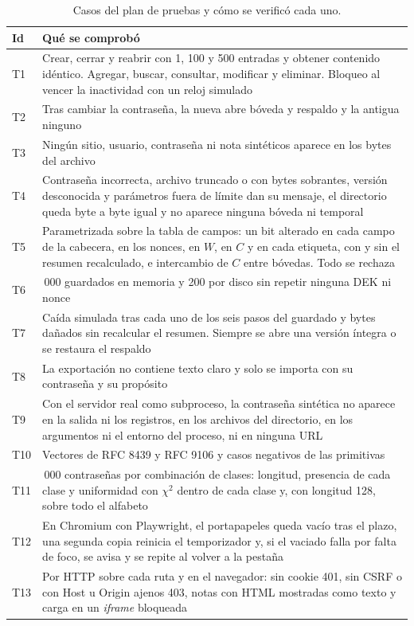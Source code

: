 \documentclass[11pt,letterpaper]{article}
\begin{document}
\begin{table}[h]
\centering\small
\caption{Casos del plan de pruebas y cómo se verificó cada uno.}
\label{tab:pruebas}
\begin{tabularx}{\linewidth}{@{}l>{\raggedright\arraybackslash}X@{}}
\toprule
Id & Qué se comprobó \\
\midrule
T1 & Crear, cerrar y reabrir con 1, 100 y 500 entradas y obtener contenido idéntico. Agregar, buscar, consultar, modificar y eliminar. Bloqueo al vencer la inactividad con un reloj simulado \\
T2 & Tras cambiar la contraseña, la nueva abre bóveda y respaldo y la antigua ninguno \\
T3 & Ningún sitio, usuario, contraseña ni nota sintéticos aparece en los bytes del archivo \\
T4 & Contraseña incorrecta, archivo truncado o con bytes sobrantes, versión desconocida y parámetros fuera de límite dan su mensaje, el directorio queda byte a byte igual y no aparece ninguna bóveda ni temporal \\
T5 & Parametrizada sobre la tabla de campos: un bit alterado en cada campo de la cabecera, en los nonces, en $W$, en $C$ y en cada etiqueta, con y sin el resumen recalculado, e intercambio de $C$ entre bóvedas. Todo se rechaza \\
T6 & 10\,000 guardados en memoria y 200 por disco sin repetir ninguna DEK ni nonce \\
T7 & Caída simulada tras cada uno de los seis pasos del guardado y bytes dañados sin recalcular el resumen. Siempre se abre una versión íntegra o se restaura el respaldo \\
T8 & La exportación no contiene texto claro y solo se importa con su contraseña y su propósito \\
T9 & Con el servidor real como subproceso, la contraseña sintética no aparece en la salida ni los registros, en los archivos del directorio, en los argumentos ni el entorno del proceso, ni en ninguna URL \\
T10 & Vectores de RFC 8439 y RFC 9106 y casos negativos de las primitivas \\
T11 & 10\,000 contraseñas por combinación de clases: longitud, presencia de cada clase y uniformidad con $\chi^2$ dentro de cada clase y, con longitud 128, sobre todo el alfabeto \\
T12 & En Chromium con Playwright, el portapapeles queda vacío tras el plazo, una segunda copia reinicia el temporizador y, si el vaciado falla por falta de foco, se avisa y se repite al volver a la pestaña \\
T13 & Por HTTP sobre cada ruta y en el navegador: sin cookie 401, sin CSRF o con Host u Origin ajenos 403, notas con HTML mostradas como texto y carga en un \emph{iframe} bloqueada \\
\bottomrule
\end{tabularx}
\end{table}
\end{document}
